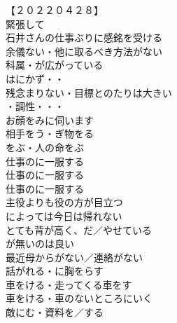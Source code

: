 \begin{multicols}{2}
【２０２２０４２８】\\
緊張して\\
石井さんの仕事ぶりに感銘を受ける\\
余儀ない・他に取るべき方法がない\\
科属・が広がっている\\
はにかず・・\\
残念まりない・目標とのたりは大きい\\
・調性・・・\\

お顔をみに伺います\\
相手をう・ぎ物をる\\
をぶ・人の命をぶ\\

仕事のに一服する\\
仕事のに一服する\\
仕事のに一服する\\
主役よりも役の方が目立つ\\
によっては今日は帰れない\\
とても背が高く、だ／やせている\\

が無いのは良い\\
最近母からがない／連絡がない\\
話がれる・に胸をらす\\
車をける・走ってくる車をす\\
車をける・車のないところにいく\\
敵にむ・資料を／する\\


\end{multicols}
